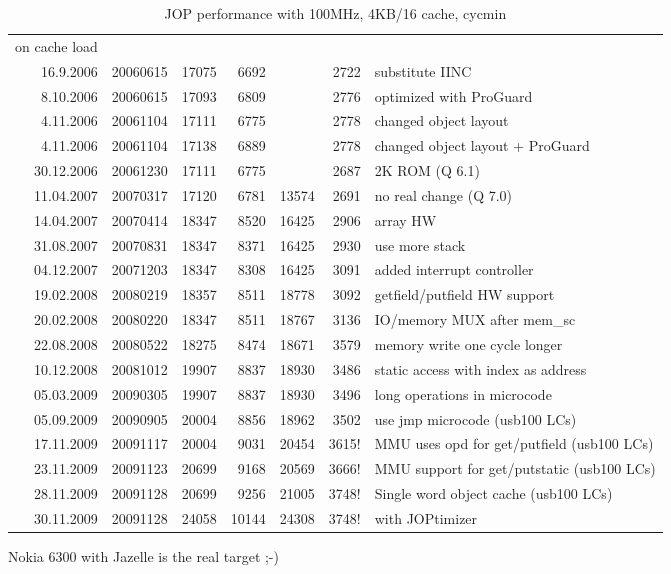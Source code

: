 \documentclass[a4paper,12pt]{scrartcl}
\begin{document}
\begin{table}
\begin{tabular}{rrrrrrl}
        on cache load\\
        16.9.2006 & 20060615 & 17075 & 6692 & & 2722 & substitute
        IINC\\
        8.10.2006 & 20060615 & 17093 & 6809 & & 2776 & optimized
        with ProGuard\\
        4.11.2006 & 20061104 & 17111 & 6775 & & 2778 & changed
        object layout\\
        4.11.2006 & 20061104 & 17138 & 6889 & & 2778 & changed
        object layout + ProGuard\\
        30.12.2006 & 20061230 & 17111 & 6775 & & 2687 & 2K ROM (Q 6.1)\\
        11.04.2007 & 20070317 & 17120 & 6781 & 13574 & 2691 & no real
        change (Q 7.0)\\
        14.04.2007 & 20070414 & 18347 & 8520 & 16425 & 2906 & array HW \\
        31.08.2007 & 20070831 & 18347 & 8371 & 16425 & 2930 & use more stack \\
        04.12.2007 & 20071203 & 18347 & 8308 & 16425 & 3091 & added interrupt controller \\
        19.02.2008 & 20080219 & 18357 & 8511 & 18778 & 3092 & getfield/putfield HW support \\
        20.02.2008 & 20080220 & 18347 & 8511 & 18767 & 3136 & IO/memory MUX after mem\_sc \\
        22.08.2008 & 20080522 & 18275 & 8474 & 18671 & 3579 & memory write one cycle longer \\
        10.12.2008 & 20081012 & 19907 & 8837 & 18930 & 3486 & static access with index as address \\
        05.03.2009 & 20090305 & 19907 & 8837 & 18930 & 3496 & long operations in microcode \\
        05.09.2009 & 20090905 & 20004 & 8856 & 18962 & 3502 & use jmp microcode (usb100 LCs) \\
        17.11.2009 & 20091117 & 20004 & 9031 & 20454 & 3615! & MMU uses opd for get/putfield (usb100 LCs) \\
        23.11.2009 & 20091123 & 20699 & 9168 & 20569 & 3666! & MMU support for get/putstatic (usb100 LCs) \\
        28.11.2009 & 20091128 & 20699 & 9256 & 21005 & 3748! & Single word object cache (usb100 LCs) \\
        30.11.2009 & 20091128 & 24058 & 10144 & 24308 & 3748! & with JOPtimizer \\
        \bottomrule
    \end{tabular}
    \caption{JOP performance with 100MHz, 4KB/16 cache, cycmin}
    \label{tab:perf}


\end{table}
Nokia 6300 with Jazelle is the real target ;-)
\end{document}
